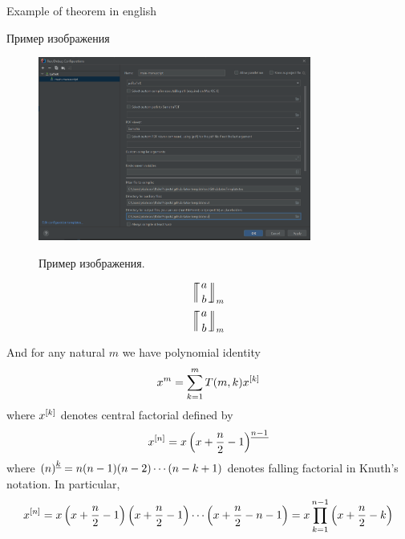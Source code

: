 \begin{thm}
    Example of theorem in english
\end{thm}

Пример изображения
\begin{figure}[H]
    \centering
    \includegraphics[width=0.8\textwidth]{../img/latex_configuration}
    ~\caption{Пример изображения.}\label{fig:figure}
\end{figure}

\begin{equation*}
    \llceil \nobarfrac{a}{b} \rrfloor_{m}
\end{equation*}
\begin{equation*}
    \llceilCoefficient{a}{b}{m}
\end{equation*}

And for any natural $m$ we have polynomial identity
\begin{equation}
    x^m = \sum_{k=1}^{m} T(m, k) x^{[k]}\label{eq:knuth-power-identity}
\end{equation}
where $x^{[k]}$ denotes central factorial defined by
\begin{equation*}
    x^{[n]} = x \left(x+\frac{n}{2}-1 \right)^{\underline{n-1}}
\end{equation*}
where $\left(n \right)^{\underline{k}} = n (n-1) (n-2) \cdots (n-k+1)$ denotes falling factorial in Knuth's notation.
In particular,
\begin{equation*}
    x^{[n]}
    = x \left( x+\frac{n}{2}-1 \right) \left( x+\frac{n}{2}-1 \right) \cdots \left (x+\frac{n}{2}-n-1 \right)
    = x \prod_{k=1}^{n-1} \left( x+\frac{n}{2}-k \right)
\end{equation*}
